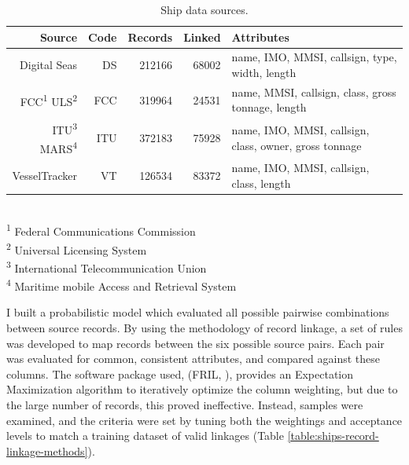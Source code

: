 \begin{table}[htbp]
  \caption[Ship data sources]{Ship data sources.}
  \tabcolsep=0.11cm
  \begin{tabular}{rrrrl}%
    \hline
    \small{Source} & \small{Code} & \small{Records} & \small{Linked} & \small{Attributes} \\
    \hline
     Digital Seas & DS & 212166 & 68002 & {\footnotesize name, IMO, MMSI, callsign, type, width, length} \\
      FCC\textsuperscript{1} ULS\textsuperscript{2} & FCC & 319964 & 24531 & {\footnotesize name, MMSI, callsign, class, gross tonnage, length} \\
      ITU\textsuperscript{3} MARS\textsuperscript{4} & ITU & 372183 & 75928 & {\footnotesize name, IMO, MMSI, callsign, class, owner, gross tonnage}\\ 
     VesselTracker & VT & 126534 & 83372 & {\footnotesize name, IMO, MMSI, callsign, class, length}
  \end{tabular}
\\
  \textsuperscript{1} Federal Communications Commission \\ 
  \textsuperscript{2} Universal Licensing System \\
  \textsuperscript{3} International Telecommunication Union \\ 
  \textsuperscript{4} Maritime mobile Access and Retrieval System \\
  \label{table:ships-data-sources}
\end{table}

I built a probabilistic model which evaluated all possible pairwise combinations between source records. By using the methodology of record linkage, a set of rules was developed to map records between the six possible source pairs. Each pair was evaluated for common, consistent attributes, and compared against these columns. The software package used, (FRIL, \citealp{Jurczyk2008fril}), provides an Expectation Maximization algorithm to iteratively optimize the column weighting, but due to the large number of records, this proved ineffective. Instead, samples were examined, and the criteria were set by tuning both the weightings and acceptance levels to match a training dataset of valid linkages (Table \ref{table:ships-record-linkage-methods}). 

